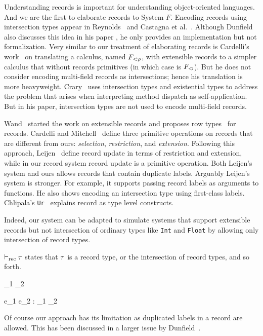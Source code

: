 
Understanding records is important for understanding object-oriented languages.
And we are the first to elaborate records to System $ F $. Encoding records
using intersection types appear in Reynolds~\cite{reynolds1997design} and
Castagna et al.~\cite{castagna1995calculus}. Although Dunfield also discusses
this idea in his paper \cite{dunfield2014elaborating}, he only provides an
implementation but not formalization. Very similar to our treatment of
elaborating records is Cardelli's work~\cite{cardelli1992extensible} on
translating a calculus, named $ F_{<\!: \rho}$, with extensible records to a
simpler calculus that without records primitives (in which case is
$ F_{<\!:} $). But he does not consider encoding multi-field records as
intersections; hence his translation is more heavyweight.
Crary~\cite{crary1998simple} uses intersection types and existential types to
address the problem that arises when interpreting method dispatch as
self-application. But in his paper, intersection types are not used to encode
multi-field records.

Wand~\cite{wand1987complete} started the work on extensible records and proposes
row types~\cite{wand1989type} for records. Cardelli and
Mitchell~\cite{cardelli1990operations} define three primitive operations on
records that are different from ours: \emph{selection}, \emph{restriction}, and
\emph{extension}. Following this approach, Leijen~\cite{leijen2005extensible}
define record update in terms of restriction and extension, while in our record
system record update is a primitive operation. Both Leijen's system and ours
allows records that contain duplicate labels. Arguably Leijen's system is
stronger. For example, it supports passing record labels as arguments to
functions. He also shows encoding an intersection type using first-class labels.
Chlipala's \texttt{Ur}~\cite{chlipala2010ur} explains record as type level
constructs.



Indeed, our system can be adapted to simulate systems that support extensible
records but not intersection of ordinary types like \texttt{Int} and
\texttt{Float} by allowing only intersection of record types.

$ \vdash_{\textrm{rec}} \tau $ states that $ \tau $ is a record type, or the intersection of
record types, and so forth.


{\turnsrec \ty_1 \intersects \ty_2}

{\Gamma \turns e_1 \dcomma e_2 : \ty_1 \intersects \ty_2 }

Of course our approach has its limitation as duplicated labels in a record are
allowed. This has been discussed in a larger issue by
Dunfield~\cite{dunfield2014elaborating}.

